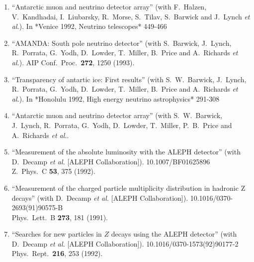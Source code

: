 \begin{enumerate}
\item ``Antarctic muon and neutrino detector array'' (with F.~Halzen, V.~Kandhadai, I.~Liubarsky, R.~Morse, S.~Tilav, S.~Barwick and J.~Lynch {\it et al.}). In *Venice 1992, Neutrino telescopes* 449-466 %


\item ``AMANDA: South pole neutrino detector'' (with S.~Barwick, J.~Lynch, R.~Porrata, G.~Yodh, D.~Lowder, T.~Miller, B.~Price and A.~Richards {\it et al.}). AIP Conf.\ Proc.\  {\bf 272}, 1250 (1993). %


\item ``Transparency of antartic ice: First results'' (with S.~W.~Barwick, J.~Lynch, R.~Porrata, G.~Yodh, D.~Lowder, T.~Miller, B.~Price and A.~Richards {\it et al.}). In *Honolulu 1992, High energy neutrino astrophysics* 291-308 %


\item ``Antarctic muon and neutrino detector array'' (with S.~W.~Barwick, J.~Lynch, R.~Porrata, G.~Yodh, D.~Lowder, T.~Miller, P.~B.~Price and A.~Richards {\it et al.}.
  


\item ``Measurement of the absolute luminosity with the ALEPH detector'' (with D.~Decamp {\it et al.}  [ALEPH Collaboration]). 10.1007/BF01625896
\\{}Z.\ Phys.\ C {\bf 53}, 375 (1992). %


\item ``Measurement of the charged particle multiplicity distribution in hadronic Z decays'' (with D.~Decamp {\it et al.}  [ALEPH Collaboration]). 10.1016/0370-2693(91)90575-B
\\{}Phys.\ Lett.\ B {\bf 273}, 181 (1991). %


\item ``Searches for new particles in $Z$ decays using the ALEPH detector'' (with D.~Decamp {\it et al.}  [ALEPH Collaboration]). 10.1016/0370-1573(92)90177-2
\\{}Phys.\ Rept.\  {\bf 216}, 253 (1992). %



\end{enumerate}
